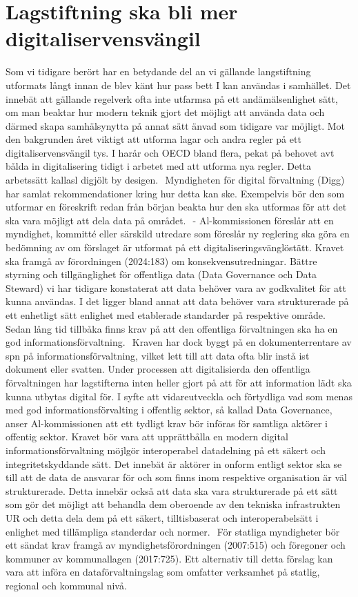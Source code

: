 {{{{{{{{{\section*{Lagstiftning ska bli mer digitaliservensvängil} Som vi tidigare berört har en betydande del an vi gällande langstiftning utformats långt innan de blev känt hur pass bett I kan användas i samhället.
Det innebät att gällande regelverk ofta inte utfarmsa på ett andämälsenlighet sätt, om man beaktar hur modern teknik gjort det möjligt att använda data och därmed skapa samhälsynytta på annat sätt änvad som tidigare var möjligt. Mot den bakgrunden året viktigt att utforma lagar och andra regler på ett digitaliservensvängil tys. I harår och OECD bland flera, pekat på behovet avt bålda in digitalisering tidigt i arbetet med att utforma nya regler. Detta arbetssätt kallasl digjölt by desigen. \({ }^{}\)
Myndigheten för digital förvaltning (Digg) har samlat rekommendationer kring hur detta kan ske. Exempelvis bör den som utformar en föreskrift redan från början beakta hur den ska utformas för att det ska vara möjligt att dela data på området. \({ }^{}\)
- Al-kommissionen föreslår att en myndighet, kommitté eller särskild utredare som föreslår ny reglering ska göra en bedömning av om förslaget är utformat på ett digitaliseringsvänglöstätt.
Kravet ska framgå av förordningen (2024:183) om konsekvensutredningar.
Bättre styrning och tillgänglighet för offentliga data (Data Governance och Data Steward)
vi har tidigare konstaterat att data behöver vara av godkvalitet för att kunna användas. I det ligger bland annat att data behöver vara strukturerade på ett enhetligt sätt enlighet med etablerade standarder på respektive område. Sedan lång tid tillbåka finns krav på att den offentliga förvaltningen ska ha en god informationsförvaltning. \({ }^{}\) Kraven har dock byggt på en dokumenterrentare av spn på informationsförvaltning, vilket lett till att data ofta blir instå ist dokument eller svatten. Under processen att digitalisierda den offentliga förvaltningen har lagstifterna inten heller gjort på att för att information lädt ska kunna utbytas digital för.
I syfte att vidareutveckla och förtydliga vad som menas med god informationsförvalting i offentlig sektor, så kallad Data Governance, anser Al-kommissionen att ett tydligt krav bör införas för samtliga aktörer i offentig sektor. Kravet bör vara att upprättbålla en modern digital informationsförvaltning möjlgör interoperabel datadelning på ett säkert och integritetskyddande sätt. Det innebät är aktörer in onform entligt sektor ska se till att de data de ansvarar för och som finns inom respektive organisation är väl strukturerade. Detta innebär också att data ska vara strukturerade på ett sätt som gör det möjligt att behandla dem oberoende av den tekniska infrastrukten UR och detta dela dem på ett säkert, tilltisbaserat och interoperabelsätt i enlighet med tillämpliga standerdar och normer. \({ }^{}\) För statliga myndigheter bör ett sändat krav framgå av myndighetsförordningen (2007:515) och föregoner och kommuner av kommunallagen (2017:725). Ett alternativ till detta förslag kan vara att införa en dataförvaltningslag som omfatter verksamhet på statlig, regional och kommunal nivå.
}}}}}}}}}

